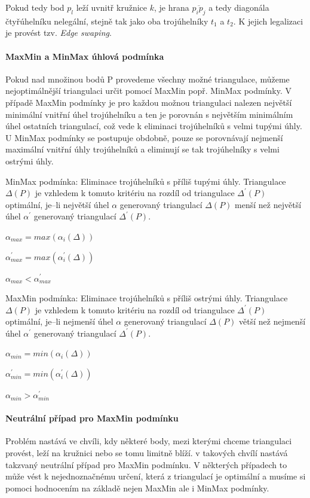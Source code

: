 \documentclass[12pt,a4paper]{article}
\begin{document}
Pokud tedy bod $p_l$ leží uvnitř kružnice $k$, je hrana $\overline{p_ip_j}$ a tedy diagonála čtyřúhelníku nelegální, stejně tak jako oba trojúhelníky $t_1$ a $t_2$. K jejich legalizaci je provést tzv. \emph{Edge swaping}.

\paragraph{MaxMin a MinMax úhlová podmínka}

Pokud nad množinou bodů P provedeme všechny možné triangulace, můžeme nejoptimálnější triangulaci určit pomocí MaxMin popř. MinMax podmínky. V případě MaxMin podmínky je pro každou možnou triangulaci nalezen největší minimální vnitřní úhel trojúhelníku a ten je porovnán s největším minimálním úhel ostatních triangulací, což vede k eliminaci trojúhelníků s velmi tupými úhly. U MinMax podmínky se postupuje obdobně, pouze se porovnávají nejmenší maximální vnitřní úhly trojúhelníků a eliminují se tak trojúhelníky s velmi ostrými úhly.

\newpage
MinMax podmínka:
Eliminace trojúhelníků s příliš tupými úhly. Triangulace $\Delta(P)$ je vzhledem k tomuto kritériu na rozdíl od triangulace $\Delta^{'}(P)$ optimální, je–li největší úhel $\alpha$ generovaný triangulací $\Delta(P)$ menší než největší úhel $\alpha^{'}$ generovaný triangulací $\Delta^{'}(P)$.

$\alpha_{max} = max(\alpha_i(\Delta))$

$\alpha^{'}_{max} = max(\alpha_i^{'}(\Delta))$

$\alpha_{max} < \alpha^{'}_{max}$

\bigskip
MaxMin podmínka:
Eliminace trojúhelníků s příliš ostrými úhly. Triangulace $\Delta(P)$ je vzhledem k tomuto kritériu na rozdíl od triangulace $\Delta^{'}(P)$ optimální, je–li nejmenší úhel $\alpha$ generovaný triangulací $\Delta(P)$ větší než nejmenší úhel $\alpha^{'}$ generovaný triangulací $\Delta^{'}(P)$.

$\alpha_{min} = min(\alpha_i(\Delta))$

$\alpha^{'}_{min} = min(\alpha_i^{'}(\Delta))$

$\alpha_{min} > \alpha^{'}_{min}$

\paragraph{Neutrální případ pro MaxMin podmínku}

Problém nastává ve chvíli, kdy některé body, mezi kterými chceme triangulaci provést, leží na kružnici nebo se tomu limitně blíží. v takových chvílí nastává takzvaný neutrální případ pro MaxMin podmínku. V některých případech to může vést k nejednoznačnému určení, která z triangulací je optimální a musíme si pomoci hodnocením na základě nejen MaxMin ale i MinMax podmínky.
\end{document}
